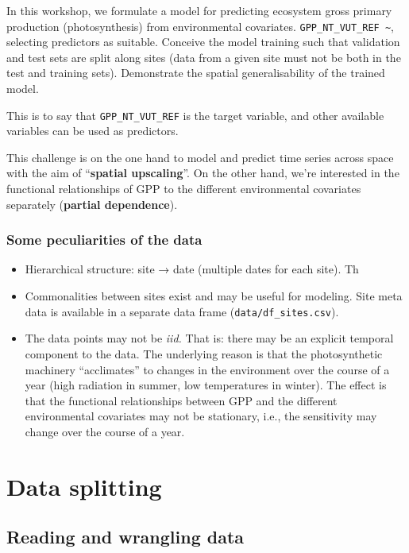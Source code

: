 \documentclass[
]{book}
\providecommand{\tightlist}{%
  \setlength{\itemsep}{0pt}\setlength{\parskip}{0pt}}
\begin{document}
In this workshop, we formulate a model for predicting ecosystem gross primary production (photosynthesis) from environmental covariates. \texttt{GPP\_NT\_VUT\_REF\ \textasciitilde{}}, selecting predictors as suitable. Conceive the model training such that validation and test sets are split along sites (data from a given site must not be both in the test and training sets). Demonstrate the spatial generalisability of the trained model.

This is to say that \texttt{GPP\_NT\_VUT\_REF} is the target variable, and other available variables can be used as predictors.

This challenge is on the one hand to model and predict time series across space with the aim of ``\textbf{spatial upscaling}''. On the other hand, we're interested in the functional relationships of GPP to the different environmental covariates separately (\textbf{partial dependence}).

\hypertarget{some-peculiarities-of-the-data}{%
\subsection{Some peculiarities of the data}\label{some-peculiarities-of-the-data}}

\begin{itemize}
\tightlist
\item
  Hierarchical structure: site → date (multiple dates for each site). Th
\item
  Commonalities between sites exist and may be useful for modeling. Site meta data is available in a separate data frame (\texttt{data/df\_sites.csv}).
\item
  The data points may not be \emph{iid.} That is: there may be an explicit temporal component to the data. The underlying reason is that the photosynthetic machinery ``acclimates'' to changes in the environment over the course of a year (high radiation in summer, low temperatures in winter). The effect is that the functional relationships between GPP and the different environmental covariates may not be stationary, i.e., the sensitivity may change over the course of a year.
\end{itemize}

\hypertarget{data-splitting}{%
\chapter{Data splitting}\label{data-splitting}}

\hypertarget{reading-and-wrangling-data}{%
\section{Reading and wrangling data}\label{reading-and-wrangling-data}}
\end{document}
